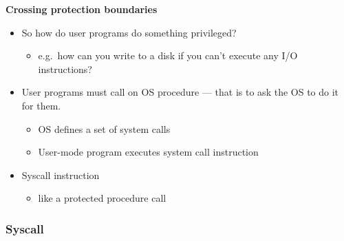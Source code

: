 \documentclass[11pt,a4paper]{article}
\begin{document}
\textbf{Crossing protection boundaries}
\begin{itemize}
    \item So how do user programs do something privileged?
        \begin{itemize}
            \item e.g.\ how can you write to a disk if you can't execute any I/O instructions?
        \end{itemize}
    \item User programs must call on OS procedure --- that is to ask the OS to do it for them.
        \begin{itemize}
            \item OS defines a set of system calls
            \item User-mode program executes system call instruction
        \end{itemize}
    \item Syscall instruction
        \begin{itemize}
            \item like a protected procedure call
        \end{itemize}
\end{itemize}

\subsubsection{Syscall}
\end{document}
